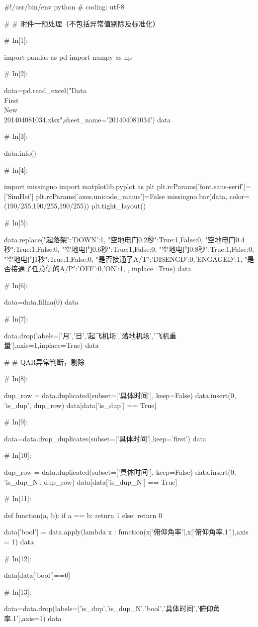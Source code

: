 \documentclass{MathorCupModeling}
\begin{document}
\begin{python}
#!/usr/bin/env python
# coding: utf-8

# # 附件一预处理（不包括异常值剔除及标准化）

# In[1]:


import pandas as pd
import numpy as np


# In[2]:


data=pd.read_excel("Data\\First\\New\\201404081034.xlsx",sheet_name='201404081034')
data


# In[3]:


data.info()


# In[4]:


import missingno
import matplotlib.pyplot as plt
plt.rcParams['font.sans-serif']=['SimHei']
plt.rcParams['axes.unicode_minus']=False
missingno.bar(data, color=(190/255,190/255,190/255))
plt.tight_layout()


# In[5]:


data.replace({"起落架":{'DOWN':1},
              "空地电门0.2秒":{True:1,False:0},
              "空地电门0.4秒":{True:1,False:0},
              "空地电门0.6秒":{True:1,False:0},
              "空地电门0.8秒":{True:1,False:0},
              "空地电门1秒":{True:1,False:0},
              "是否接通了A/T":{'DISENGD':0,'ENGAGED':1},
              "是否接通了任意侧的A/P":{'OFF':0,'ON':1},
              }, inplace=True)
data


# In[6]:


data=data.fillna(0)
data


# In[7]:


data.drop(labels=['月','日','起飞机场','落地机场','飞机重量'],axis=1,inplace=True)
data


# # QAR异常判断，剔除

# In[8]:


dup_row = data.duplicated(subset=['具体时间'], keep=False)
data.insert(0, 'is_dup', dup_row)
data[data['is_dup'] == True]


# In[9]:


data=data.drop_duplicates(subset=['具体时间'],keep='first')
data


# In[10]:


dup_row = data.duplicated(subset=['具体时间'], keep=False)
data.insert(0, 'is_dup_N', dup_row)
data[data['is_dup_N'] == True]


# In[11]:


def function(a, b):
    if a == b:
        return 1
    else:
        return 0


data['bool'] = data.apply(lambda x : function(x['俯仰角率'],x['俯仰角率.1']),axis = 1)
data


# In[12]:


data[data['bool']==0]


# In[13]:


data=data.drop(labels=['is_dup','is_dup_N','bool','具体时间','俯仰角率.1'],axis=1)
data


\end{python}
\end{document}
